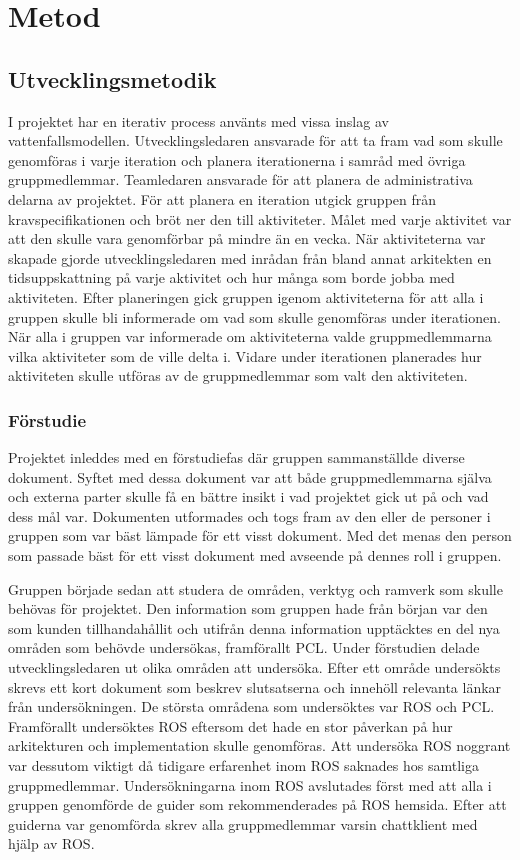 \chapter{Metod}
\label{cha:method}

\section{Utvecklingsmetodik}

I projektet har en iterativ process använts med vissa inslag av vattenfallsmodellen. Utvecklingsledaren ansvarade för att ta fram vad som skulle genomföras i varje iteration och planera iterationerna i samråd med övriga gruppmedlemmar. Teamledaren ansvarade för att planera de administrativa delarna av projektet. För att planera en iteration utgick gruppen från kravspecifikationen och bröt ner den till aktiviteter. Målet med varje aktivitet var att den skulle vara genomförbar på mindre än en vecka. När aktiviteterna var skapade gjorde utvecklingsledaren med inrådan från bland annat arkitekten en tidsuppskattning på varje aktivitet och hur många som borde jobba med aktiviteten. Efter planeringen gick gruppen igenom aktiviteterna för att alla i gruppen skulle bli informerade om vad som skulle genomföras under iterationen. När alla i gruppen var informerade om aktiviteterna valde gruppmedlemmarna vilka aktiviteter som de ville delta i. Vidare under iterationen planerades hur aktiviteten skulle utföras av de gruppmedlemmar som valt den aktiviteten.

\subsection{Förstudie}

Projektet inleddes med en förstudiefas där gruppen sammanställde diverse dokument. Syftet med dessa dokument var att både gruppmedlemmarna själva och externa parter skulle få en bättre insikt i vad projektet gick ut på och vad dess mål var. Dokumenten utformades och togs fram av den eller de personer i gruppen som var bäst lämpade för ett visst dokument. Med det menas den person som passade bäst för ett visst dokument med avseende på dennes roll i gruppen.

Gruppen började sedan att studera de områden, verktyg och ramverk som skulle behövas för projektet. Den information som gruppen hade från början var den som kunden tillhandahållit och utifrån denna information upptäcktes en del nya områden som behövde undersökas, framförallt PCL. Under förstudien delade utvecklingsledaren ut olika områden att undersöka. Efter ett område undersökts skrevs ett kort dokument som beskrev slutsatserna och innehöll relevanta länkar från undersökningen. De största områdena som undersöktes var ROS och PCL. Framförallt undersöktes ROS eftersom det hade en stor påverkan på hur arkitekturen och implementation skulle genomföras. Att undersöka ROS noggrant var dessutom viktigt då tidigare erfarenhet inom ROS saknades hos samtliga gruppmedlemmar. 
Undersökningarna inom ROS avslutades först med att alla i gruppen genomförde de guider som rekommenderades på ROS hemsida. Efter att guiderna var genomförda skrev alla gruppmedlemmar varsin chattklient med hjälp av ROS.


